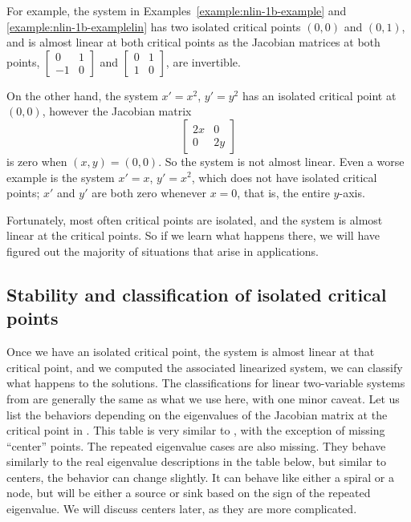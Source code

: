 \documentclass{ximera}
\begin{document}
For example, the system in Examples~\ref{example:nlin-1b-example} and \ref{example:nlin-1b-examplelin} has two isolated critical points $(0,0)$ and $(0,1)$, and is almost linear at both critical points as the Jacobian matrices at both points,
$\left[ \begin{smallmatrix} 0 & 1 \\ -1 & 0 \end{smallmatrix} \right]$ and
$\left[ \begin{smallmatrix} 0 & 1 \\ 1 & 0 \end{smallmatrix} \right]$,
are invertible.

On the other hand, the system $x' = x^2$, $y' = y^2$ has an isolated critical point at $(0,0)$, however the Jacobian matrix
\begin{equation*}
    \begin{bmatrix} 
        2x & 0 \\ 
        0 & 2y 
    \end{bmatrix}
\end{equation*}
is zero when $(x,y) = (0,0)$.  So the system is not almost linear. Even a worse example is the system $x' = x$, $y' = x^2$, which does not have isolated critical points; $x'$ and $y'$ are both zero whenever $x=0$, that is, the entire $y$-axis.

Fortunately, most often critical points are isolated, and the system is almost linear at the critical points.  So if we learn what happens there, we will have figured out the majority of situations that arise in applications.



\subsection{Stability and classification of isolated critical points}

Once we have an isolated critical point, the system is almost linear at that critical point, and we computed the associated linearized system, we can classify what happens to the solutions.  The classifications for linear two-variable systems from  are generally the same as what we use here, with one minor caveat. Let us list the behaviors depending on the eigenvalues of the Jacobian matrix at the critical point in . This table is very similar to , with the exception of missing ``center'' points. The repeated eigenvalue cases are also missing. They behave similarly to the real eigenvalue descriptions in the table below, but similar to centers, the behavior can change slightly. It can behave like either a spiral or a node, but will be either a source or sink based on the sign of the repeated eigenvalue. 
We will discuss centers later, as they are more complicated.
\end{document}

